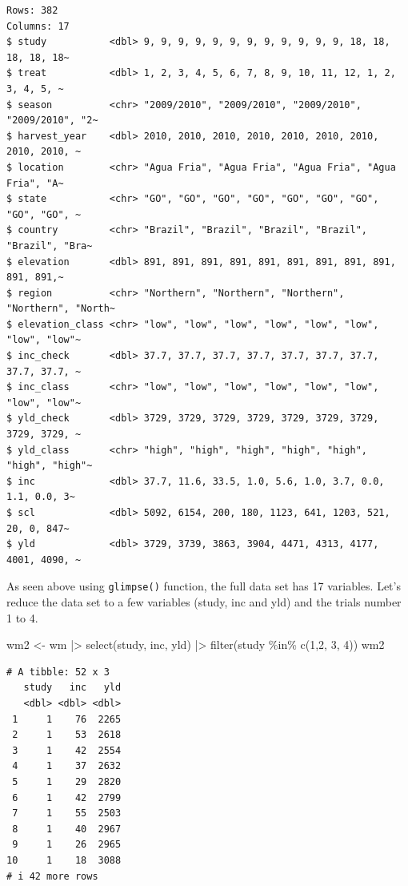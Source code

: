 \documentclass[
  letterpaper,
]{book}
\newenvironment{Shaded}{\begin{snugshade}}{\end{snugshade}}
\newcommand{\DecValTok}[1]{\textcolor[rgb]{0.68,0.00,0.00}{#1}}
\newcommand{\FunctionTok}[1]{\textcolor[rgb]{0.28,0.35,0.67}{#1}}
\newcommand{\NormalTok}[1]{\textcolor[rgb]{0.00,0.23,0.31}{#1}}
\newcommand{\OtherTok}[1]{\textcolor[rgb]{0.00,0.23,0.31}{#1}}
\newcommand{\SpecialCharTok}[1]{\textcolor[rgb]{0.37,0.37,0.37}{#1}}
\begin{document}
\begin{verbatim}
Rows: 382
Columns: 17
$ study           <dbl> 9, 9, 9, 9, 9, 9, 9, 9, 9, 9, 9, 9, 18, 18, 18, 18, 18~
$ treat           <dbl> 1, 2, 3, 4, 5, 6, 7, 8, 9, 10, 11, 12, 1, 2, 3, 4, 5, ~
$ season          <chr> "2009/2010", "2009/2010", "2009/2010", "2009/2010", "2~
$ harvest_year    <dbl> 2010, 2010, 2010, 2010, 2010, 2010, 2010, 2010, 2010, ~
$ location        <chr> "Agua Fria", "Agua Fria", "Agua Fria", "Agua Fria", "A~
$ state           <chr> "GO", "GO", "GO", "GO", "GO", "GO", "GO", "GO", "GO", ~
$ country         <chr> "Brazil", "Brazil", "Brazil", "Brazil", "Brazil", "Bra~
$ elevation       <dbl> 891, 891, 891, 891, 891, 891, 891, 891, 891, 891, 891,~
$ region          <chr> "Northern", "Northern", "Northern", "Northern", "North~
$ elevation_class <chr> "low", "low", "low", "low", "low", "low", "low", "low"~
$ inc_check       <dbl> 37.7, 37.7, 37.7, 37.7, 37.7, 37.7, 37.7, 37.7, 37.7, ~
$ inc_class       <chr> "low", "low", "low", "low", "low", "low", "low", "low"~
$ yld_check       <dbl> 3729, 3729, 3729, 3729, 3729, 3729, 3729, 3729, 3729, ~
$ yld_class       <chr> "high", "high", "high", "high", "high", "high", "high"~
$ inc             <dbl> 37.7, 11.6, 33.5, 1.0, 5.6, 1.0, 3.7, 0.0, 1.1, 0.0, 3~
$ scl             <dbl> 5092, 6154, 200, 180, 1123, 641, 1203, 521, 20, 0, 847~
$ yld             <dbl> 3729, 3739, 3863, 3904, 4471, 4313, 4177, 4001, 4090, ~
\end{verbatim}

As seen above using \texttt{glimpse()} function, the full data set has
17 variables. Let's reduce the data set to a few variables (study, inc
and yld) and the trials number 1 to 4.

\begin{Shaded}
\begin{Highlighting}[]
\NormalTok{wm2 }\OtherTok{\textless{}{-}}\NormalTok{ wm }\SpecialCharTok{|\textgreater{}} 
  \FunctionTok{select}\NormalTok{(study, inc, yld) }\SpecialCharTok{|\textgreater{}} 
  \FunctionTok{filter}\NormalTok{(study }\SpecialCharTok{\%in\%} \FunctionTok{c}\NormalTok{(}\DecValTok{1}\NormalTok{,}\DecValTok{2}\NormalTok{, }\DecValTok{3}\NormalTok{, }\DecValTok{4}\NormalTok{)) }
\NormalTok{wm2}
\end{Highlighting}
\end{Shaded}

\begin{verbatim}
# A tibble: 52 x 3
   study   inc   yld
   <dbl> <dbl> <dbl>
 1     1    76  2265
 2     1    53  2618
 3     1    42  2554
 4     1    37  2632
 5     1    29  2820
 6     1    42  2799
 7     1    55  2503
 8     1    40  2967
 9     1    26  2965
10     1    18  3088
# i 42 more rows
\end{verbatim}
\end{document}
